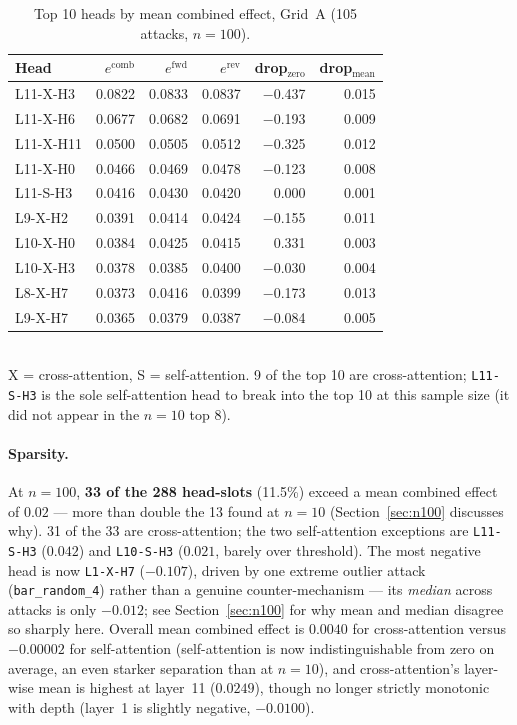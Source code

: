 \documentclass[11pt]{article}
\newcommand{\fwd}{\ensuremath{e^{\mathrm{fwd}}}}
\newcommand{\rev}{\ensuremath{e^{\mathrm{rev}}}}
\newcommand{\comb}{\ensuremath{e^{\mathrm{comb}}}}
\begin{document}
\begin{table}[H]
\centering
\caption{Top 10 heads by mean combined effect, Grid~A (105 attacks, $n=100$).}
\label{tab:top8}
\begin{tabular}{lrrrrr}
\toprule
Head & $\comb$ & $\fwd$ & $\rev$ & drop$_{\text{zero}}$ & drop$_{\text{mean}}$ \\
\midrule
L11-X-H3  & 0.0822 & 0.0833 & 0.0837 & $-$0.437 & 0.015 \\
L11-X-H6  & 0.0677 & 0.0682 & 0.0691 & $-$0.193 & 0.009 \\
L11-X-H11 & 0.0500 & 0.0505 & 0.0512 & $-$0.325 & 0.012 \\
L11-X-H0  & 0.0466 & 0.0469 & 0.0478 & $-$0.123 & 0.008 \\
L11-S-H3  & 0.0416 & 0.0430 & 0.0420 & \phantom{$-$}0.000 & 0.001 \\
L9-X-H2   & 0.0391 & 0.0414 & 0.0424 & $-$0.155 & 0.011 \\
L10-X-H0  & 0.0384 & 0.0425 & 0.0415 & \phantom{$-$}0.331 & 0.003 \\
L10-X-H3  & 0.0378 & 0.0385 & 0.0400 & $-$0.030 & 0.004 \\
L8-X-H7   & 0.0373 & 0.0416 & 0.0399 & $-$0.173 & 0.013 \\
L9-X-H7   & 0.0365 & 0.0379 & 0.0387 & $-$0.084 & 0.005 \\
\bottomrule
\end{tabular}
\\[4pt]
\footnotesize X = cross-attention, S = self-attention. 9 of the top 10 are
cross-attention; \texttt{L11-S-H3} is the sole self-attention head to break
into the top 10 at this sample size (it did not appear in the $n=10$ top 8).
\end{table}

\paragraph{Sparsity.} At $n=100$, \textbf{33 of the 288 head-slots} (11.5\%)
exceed a mean combined effect of $0.02$ — more than double the 13 found at
$n=10$ (Section~\ref{sec:n100} discusses why). 31 of the 33 are
cross-attention; the two self-attention exceptions are \texttt{L11-S-H3}
($0.042$) and \texttt{L10-S-H3} ($0.021$, barely over threshold). The most
negative head is now \texttt{L1-X-H7} ($-0.107$), driven by one extreme
outlier attack (\texttt{bar\_random\_4}) rather than a genuine
counter-mechanism — its \emph{median} across attacks is only $-0.012$; see
Section~\ref{sec:n100} for why mean and median disagree so sharply here.
Overall mean combined effect is $0.0040$ for cross-attention versus
$-0.00002$ for self-attention (self-attention is now indistinguishable from
zero on average, an even starker separation than at $n=10$), and
cross-attention's layer-wise mean is highest at layer~11 ($0.0249$), though
no longer strictly monotonic with depth (layer~1 is slightly negative,
$-0.0100$).
\end{document}
